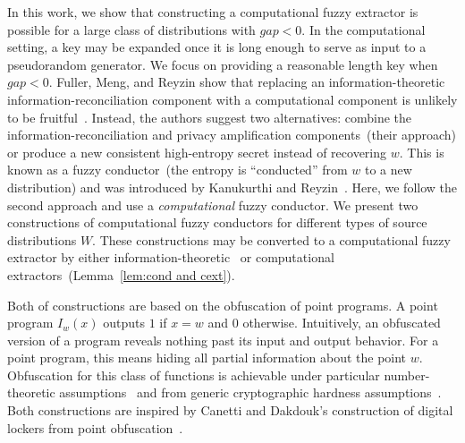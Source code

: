 \documentclass[11pt]{article}
\newcommand{\defref}[1]{\mbox{Definition~\ref{#1}}}
\newcommand{\lemref}[1]{\mbox{Lemma~\ref{#1}}}
\begin{document}
In this work, we show that constructing a computational fuzzy extractor is possible for a large class of distributions with $gap<0$.  
In the computational setting, a key may be expanded once it is long enough to serve as input to a pseudorandom generator.  We focus on providing a reasonable length key when $gap<0$.
Fuller, Meng, and Reyzin show that replacing an information-theoretic information-reconciliation component with a computational component is unlikely to be fruitful~\cite[Corollary 3.8, Theorem 3.10]{fuller2013computational}.  Instead, the authors suggest two alternatives: combine the information-reconciliation and privacy amplification components~(their approach) or produce a new consistent high-entropy secret instead of recovering $w$.  This is known as a fuzzy conductor~(the entropy is ``conducted'' from $w$ to a new distribution) and was introduced by Kanukurthi and Reyzin~\cite{KanukurthiR09}.  Here, we follow the second approach and use a \emph{computational} fuzzy conductor.  We present two constructions of computational fuzzy conductors for different types of source distributions $W$.  These constructions may be converted to a computational fuzzy extractor by either information-theoretic~\cite{nisan1993randomness} or computational~\cite{krawczyk2010cryptographic} extractors~(\lemref{lem:cond and cext}).  

Both of constructions are based on the obfuscation of point programs.  A point program $I_w(x)$ outputs $1$ if $x=w$ and $0$ otherwise.  Intuitively, an obfuscated version of a program reveals nothing past its input and output behavior.  For a point program, this means hiding all partial information about the point $w$.  Obfuscation for this class of functions is achievable under particular number-theoretic assumptions~\cite{canetti1997towards} and from generic cryptographic hardness assumptions~\cite{wee2005obfuscating}.  Both constructions are inspired by Canetti and Dakdouk's construction of digital lockers from point obfuscation~\cite{canetti2008obfuscating}.
\end{document}
